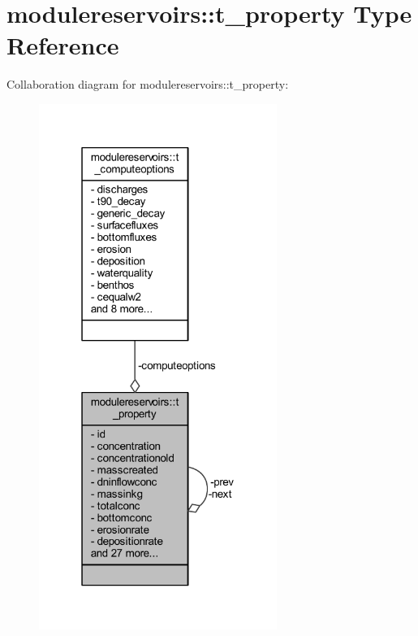 \hypertarget{structmodulereservoirs_1_1t__property}{}\section{modulereservoirs\+:\+:t\+\_\+property Type Reference}
\label{structmodulereservoirs_1_1t__property}


Collaboration diagram for modulereservoirs\+:\+:t\+\_\+property\+:\nopagebreak
\begin{figure}[H]
\begin{center}
\leavevmode
\includegraphics[width=220pt]{structmodulereservoirs_1_1t__property__coll__graph}
\end{center}
\end{figure}
